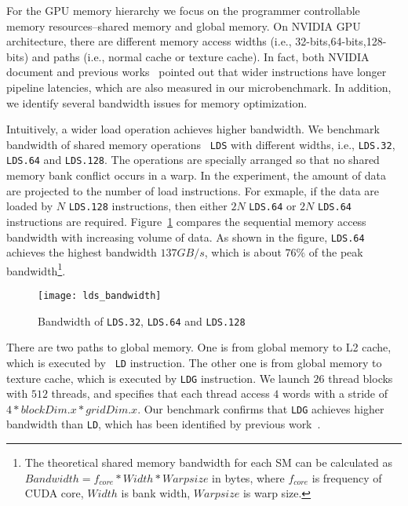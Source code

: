 For the GPU memory hierarchy we focus on the programmer controllable memory resources--shared memory and global memory. 
On NVIDIA GPU architecture, there are different memory access widths (i.e., 32-bits,64-bits,128-bits) and paths (i.e., 
normal cache or texture cache). In fact, both NVIDIA document and previous works~\cite{tan} pointed out that wider 
instructions have longer pipeline latencies, which are also measured in our microbenchmark. In addition, we identify 
several bandwidth issues for memory optimization.

Intuitively, a wider load operation achieves higher bandwidth. We benchmark bandwidth of shared memory operations {\tt 
LDS} with different widths, i.e., {\tt LDS.32}, {\tt LDS.64}
and {\tt LDS.128}. The operations are specially arranged so that no shared memory bank conflict occurs in a warp. In the
experiment, the amount of data are projected to the number of load instructions. For exmaple, if the data are loaded by
$N$ {\tt LDS.128} instructions, then either $2N$ {\tt LDS.64} or $2N$ {\tt LDS.64} instructions are required.
Figure~\ref{fig:lds_bw} compares the sequential memory access bandwidth with increasing volume of data. As shown in the 
figure, {\tt LDS.64} achieves the highest bandwidth $137GB/s$, which is about $76\%$ of the peak bandwidth\footnote{The 
theoretical shared memory bandwidth for each SM can be calculated as $Bandwidth=f_{core}*Width*Warpsize$ in
bytes, where $f_{core}$ is frequency of CUDA core, $Width$ is bank width, $Warpsize$ is warp size.}.

\begin{figure}[htbp]
\begin{center}
\texttt{[image: lds\_bandwidth]}
    \caption{ Bandwidth of {\tt LDS.32}, {\tt LDS.64} and {\tt LDS.128}}
\label{fig:lds_bw}
\end{center}
\end{figure}

There are two paths to global memory. One is from global memory to L2 cache, which is executed by {\tt
LD} instruction. The other one is from global memory to texture cache, which is executed by {\tt LDG} instruction. We
launch $26$ thread blocks with $512$ threads, and specifies that each thread access $4$ words with a stride of
$4*blockDim.x*gridDim.x$. Our benchmark confirms that {\tt LDG} achieves higher bandwidth than {\tt LD}, which has been
identified by previous work~\cite{tan}.
